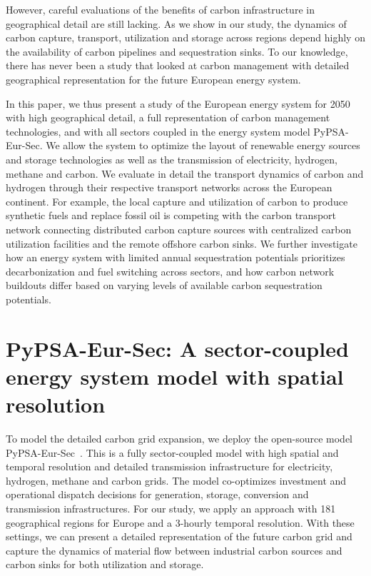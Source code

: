 \documentclass[10pt,5p,reversenotenum,lefttitle]{elsarticle}
\begin{document}
However, careful evaluations of the benefits of carbon infrastructure in geographical detail are still lacking. As we show in our study, the dynamics of carbon capture, transport, utilization and storage across regions depend highly on the availability of carbon pipelines and sequestration sinks. To our knowledge, there has never been a study that looked at carbon management with detailed geographical representation for the future European energy system.

In this paper, we thus present a study of the European energy system for 2050 with high geographical detail, a full representation of carbon management technologies, and with all sectors coupled in the energy system model PyPSA-Eur-Sec. We allow the system to optimize the layout of renewable energy sources and storage technologies as well as the transmission of electricity, hydrogen, methane and carbon. We evaluate in detail the transport dynamics of carbon and hydrogen through their respective transport networks across the European continent. For example, the local capture and utilization of carbon to produce synthetic fuels and replace fossil oil is competing with the carbon transport network connecting distributed carbon capture sources with centralized carbon utilization facilities and the remote offshore carbon sinks. We further investigate how an energy system with limited annual sequestration potentials prioritizes decarbonization and fuel switching across sectors, and how carbon network buildouts differ based on varying levels of available carbon sequestration potentials.

\section*{PyPSA-Eur-Sec: A sector-coupled energy system model with spatial resolution}
\label{sec:PyPSAEurSec}



To model the detailed carbon grid expansion, we deploy the open-source model PyPSA-Eur-Sec~\cite{PyPSAEurSecSectorCoupledOpen2023}. This is a fully sector-coupled model with high spatial and temporal resolution and detailed transmission infrastructure for electricity, hydrogen, methane and carbon grids. The model co-optimizes investment and operational dispatch decisions for generation, storage, conversion and transmission infrastructures. For our study, we apply an approach with 181 geographical regions for Europe and a 3-hourly temporal resolution. With these settings, we can present a detailed representation of the future carbon grid and capture the dynamics of material flow between industrial carbon sources and carbon sinks for both utilization and storage.
\end{document}
